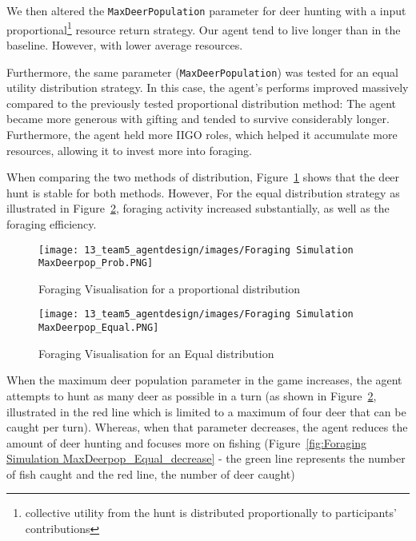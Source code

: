 We then altered the \texttt{MaxDeerPopulation} parameter for deer hunting with a input proportional\footnote{collective utility from the hunt is distributed proportionally to participants' contributions} resource return strategy. Our agent tend to live longer than in the baseline. However, with lower average resources.

Furthermore, the same parameter (\texttt{MaxDeerPopulation}) was tested for an equal utility distribution strategy. In this case, the agent's performs improved massively compared to the previously tested proportional distribution method: The agent became more generous with gifting and tended to survive considerably longer. Furthermore, the agent held more IIGO roles, which helped it accumulate more resources, allowing it to invest more into foraging.

When comparing the two methods of distribution, Figure~\ref{fig:Foraging Simulation MaxDeerpop_Prob} shows that the deer hunt is stable for both methods. However, For the equal distribution strategy as illustrated in Figure~\ref{fig:Foraging Simulation MaxDeerpop_Equal}, foraging activity increased substantially, as well as the foraging efficiency. 

\begin{figure}[!htb]
    \centering
    \texttt{[image: 13\_team5\_agentdesign/images/Foraging Simulation MaxDeerpop\_Prob.PNG]}
    \caption{Foraging Visualisation for a proportional distribution}
    \label{fig:Foraging Simulation MaxDeerpop_Prob}
\end{figure}

\begin{figure}[!htb]
    \centering
    \texttt{[image: 13\_team5\_agentdesign/images/Foraging Simulation MaxDeerpop\_Equal.PNG]}
    \caption{Foraging Visualisation for an Equal distribution}
    \label{fig:Foraging Simulation MaxDeerpop_Equal}
\end{figure}

When the maximum deer population parameter in the game increases, the agent attempts to hunt as many deer as possible in a turn (as shown in Figure~\ref{fig:Foraging Simulation MaxDeerpop_Equal}, illustrated in the red line which is limited to a maximum of four deer that can be caught per turn). Whereas, when that parameter decreases, the agent reduces the amount of deer hunting and focuses more on fishing (Figure~\ref{fig:Foraging Simulation MaxDeerpop_Equal_decrease} - the green line represents the number of fish caught and the red line, the number of deer caught)

